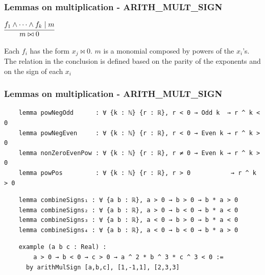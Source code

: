 \documentclass[usepdftitle=false,aspectratio=169,usenames,dvipsnames]{beamer}
\begin{document}





\begin{frame}
  \frametitle{Lemmas on multiplication - ARITH\_MULT\_SIGN}

\begin{center}
  $\infer[]{m \bowtie 0}{f_{1} \wedge \cdots \wedge f_{k} \mid m}$
\end{center}

\vspace{20pt}

Each $f_i$ has the form $x_j \bowtie 0$. $m$ is a monomial composed by powers of the $x_i$'s. The relation in
the conclusion is defined based on the parity of the exponents and on the sign of each $x_i$

\end{frame}

\begin{frame}[fragile]
  \frametitle{Lemmas on multiplication - ARITH\_MULT\_SIGN}

  \begin{lstlisting}
    lemma powNegOdd      : ∀ {k : ℕ} {r : ℝ}, r < 0 → Odd k  → r ^ k < 0
    lemma powNegEven     : ∀ {k : ℕ} {r : ℝ}, r < 0 → Even k → r ^ k > 0
    lemma nonZeroEvenPow : ∀ {k : ℕ} {r : ℝ}, r ≠ 0 → Even k → r ^ k > 0
    lemma powPos         : ∀ {k : ℕ} {r : ℝ}, r > 0           → r ^ k > 0
  \end{lstlisting}

  \begin{lstlisting}
    lemma combineSigns₁ : ∀ {a b : ℝ}, a > 0 → b > 0 → b * a > 0
    lemma combineSigns₂ : ∀ {a b : ℝ}, a > 0 → b < 0 → b * a < 0
    lemma combineSigns₃ : ∀ {a b : ℝ}, a < 0 → b > 0 → b * a < 0
    lemma combineSigns₄ : ∀ {a b : ℝ}, a < 0 → b < 0 → b * a > 0
  \end{lstlisting}

  \begin{lstlisting}
    example (a b c : Real) :
        a > 0 → b < 0 → c > 0 → a ^ 2 * b ^ 3 * c ^ 3 < 0 :=
      by arithMulSign [a,b,c], [1,-1,1], [2,3,3]
  \end{lstlisting}
\end{frame}
\end{document}
